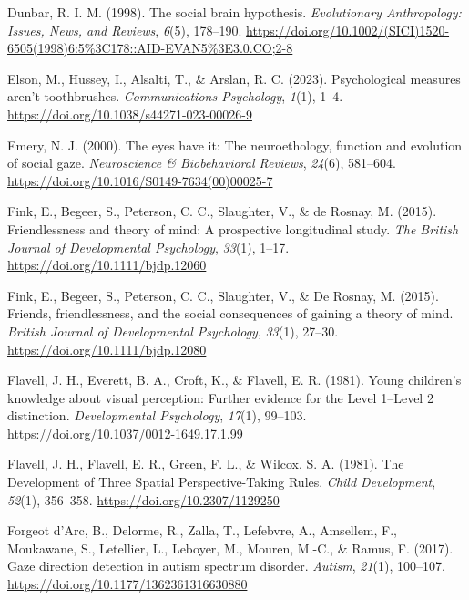 \documentclass[
]{scrbook}
\newlength{\cslhangindent}
\newenvironment{CSLReferences}[2] %
 {\begin{list}{}{%
  \setlength{\itemindent}{0pt}
  \setlength{\leftmargin}{0pt}
  \setlength{\parsep}{0pt}
  \ifodd #1
   \setlength{\leftmargin}{\cslhangindent}
   \setlength{\itemindent}{-1\cslhangindent}
  \fi
  \setlength{\itemsep}{#2\baselineskip}}}
 {\end{list}}
\begin{document}
\begin{CSLReferences}{1}{0}
Dunbar, R. I. M. (1998). The social brain hypothesis. \emph{Evolutionary Anthropology: Issues, News, and Reviews}, \emph{6}(5), 178--190. \url{https://doi.org/10.1002/(SICI)1520-6505(1998)6:5\%3C178::AID-EVAN5\%3E3.0.CO;2-8}

Elson, M., Hussey, I., Alsalti, T., \& Arslan, R. C. (2023). Psychological measures aren't toothbrushes. \emph{Communications Psychology}, \emph{1}(1), 1--4. \url{https://doi.org/10.1038/s44271-023-00026-9}

Emery, N. J. (2000). The eyes have it: The neuroethology, function and evolution of social gaze. \emph{Neuroscience \& Biobehavioral Reviews}, \emph{24}(6), 581--604. \url{https://doi.org/10.1016/S0149-7634(00)00025-7}

Fink, E., Begeer, S., Peterson, C. C., Slaughter, V., \& de Rosnay, M. (2015). Friendlessness and theory of mind: A prospective longitudinal study. \emph{The British Journal of Developmental Psychology}, \emph{33}(1), 1--17. \url{https://doi.org/10.1111/bjdp.12060}

Fink, E., Begeer, S., Peterson, C. C., Slaughter, V., \& De Rosnay, M. (2015). Friends, friendlessness, and the social consequences of gaining a theory of mind. \emph{British Journal of Developmental Psychology}, \emph{33}(1), 27--30. \url{https://doi.org/10.1111/bjdp.12080}

Flavell, J. H., Everett, B. A., Croft, K., \& Flavell, E. R. (1981). Young children's knowledge about visual perception: {Further} evidence for the {Level} 1--{Level} 2 distinction. \emph{Developmental Psychology}, \emph{17}(1), 99--103. \url{https://doi.org/10.1037/0012-1649.17.1.99}

Flavell, J. H., Flavell, E. R., Green, F. L., \& Wilcox, S. A. (1981). The {Development} of {Three Spatial Perspective-Taking Rules}. \emph{Child Development}, \emph{52}(1), 356--358. \url{https://doi.org/10.2307/1129250}

Forgeot d'Arc, B., Delorme, R., Zalla, T., Lefebvre, A., Amsellem, F., Moukawane, S., Letellier, L., Leboyer, M., Mouren, M.-C., \& Ramus, F. (2017). Gaze direction detection in autism spectrum disorder. \emph{Autism}, \emph{21}(1), 100--107. \url{https://doi.org/10.1177/1362361316630880}


\end{CSLReferences}
\end{document}
